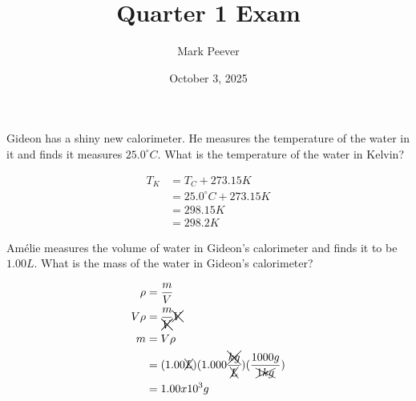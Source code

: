 \documentclass[11pt,addpoints]{exam}   	%
\title{Quarter 1 Exam}
\author{Mark Peever}
\date{October 3, 2025}							%
\begin{document}
\maketitle

\pointsinrightmargin

\begin{center}
\end{center}
\vspace{0.1in}
\vspace{0.2in}

\begin{questions}
\question[5] Gideon has a shiny new calorimeter. He measures the temperature of the water in it and finds it measures  $25.0^{\circ}C$. What is the temperature of the water in Kelvin? 
\begin{solution}
\begin{equation} 
\begin{split}
    T_K &= T_C + 273.15 K \\
            &= 25.0^{\circ}C + 273.15 K \\
            &= 298.15 K \\
            &= 298.2 K                                       
 \end{split}
 \end{equation}
 \end{solution}

\question[5] Am\'{e}lie measures the volume of water in Gideon's calorimeter and finds it to be $1.00 L$. What is the mass of the water in Gideon's calorimeter?
\begin{solution}
\begin{equation} 
\begin{split}
  \rho &= \frac{m}{V} \\
  V \rho &= \frac{m}{\xcancel{V}} \xcancel{V} \\
  m &= V \rho \\
      &= (1.00 \xcancel{L}) (1.000 \frac{\xcancel{kg}}{\xcancel{L}}) (\frac{1000 g}{\xcancel{1 kg}}) \\
      &= 1.00 x 10^3 g                                 
 \end{split}
 \end{equation}
 \end{solution}


\end{questions}
\end{document}
